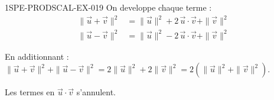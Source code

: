 \begin{corrige}{1SPE-PRODSCAL-EX-019}
On developpe chaque terme :
\begin{align*}
\|\vec{u} + \vec{v}\|^2 &= \|\vec{u}\|^2 + 2\,\vec{u} \cdot \vec{v} + \|\vec{v}\|^2 \\
\|\vec{u} - \vec{v}\|^2 &= \|\vec{u}\|^2 - 2\,\vec{u} \cdot \vec{v} + \|\vec{v}\|^2
\end{align*}

En additionnant :
$\|\vec{u} + \vec{v}\|^2 + \|\vec{u} - \vec{v}\|^2 = 2\|\vec{u}\|^2 + 2\|\vec{v}\|^2 = 2\left(\|\vec{u}\|^2 + \|\vec{v}\|^2\right)$.

Les termes en $\vec{u} \cdot \vec{v}$ s'annulent.
\end{corrige}
